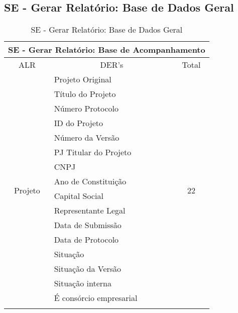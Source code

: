       
  \pagebreak
  
  \subsection{SE - Gerar Relatório: Base de Dados Geral}
   
    \begin{table}[!h]
    \centering
    \caption{SE - Gerar Relatório: Base de Dados Geral}
    \label{se_base_geral}
    \begin{tabular}{|c|l|c|}
    \hline
    \multicolumn{3}{|c|}{SE - Gerar Relatório: Base de Acompanhamento}                 \\ \hline
    ALR                         & \multicolumn{1}{c|}{DER's}    & Total                \\ \hline
    \multirow{21}{*}{Projeto}   & Projeto Original              & \multirow{21}{*}{22} \\ \cline{2-2}
				& Título do Projeto             &                      \\ \cline{2-2}
				& Número Protocolo              &                      \\ \cline{2-2}
				& ID do Projeto                 &                      \\ \cline{2-2}
				& Número da Versão              &                      \\ \cline{2-2}
				& PJ Titular do Projeto         &                      \\ \cline{2-2}
				& CNPJ                          &                      \\ \cline{2-2}
				& Ano de Constituição           &                      \\ \cline{2-2}
				& Capital Social                &                      \\ \cline{2-2}
				& Representante Legal           &                      \\ \cline{2-2}
				& Data de Submissão             &                      \\ \cline{2-2}
				& Data de Protocolo             &                      \\ \cline{2-2}
				& Situação                      &                      \\ \cline{2-2}
				& Situação da Versão            &                      \\ \cline{2-2}
				& Situação interna              &                      \\ \cline{2-2}
				& É consórcio empresarial       &                      \\ \cline{2-2}

\end{tabular}
\end{table}
